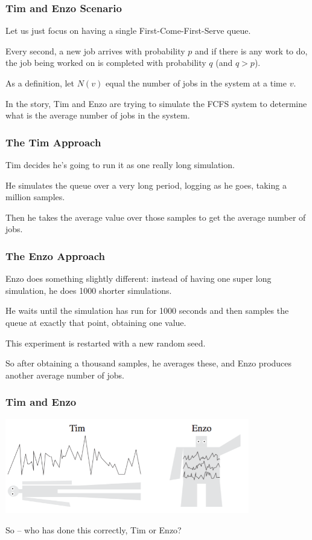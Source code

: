 \begin{frame}
\frametitle{Tim and Enzo Scenario}

Let us just focus on having a single First-Come-First-Serve queue. 

Every second, a new job arrives with probability $p$ and if there is any work to do, the job being worked on is completed with probability $q$ (and $q > p$). 

As a definition, let $N(v)$ equal the number of jobs in the system at a time $v$. 

In the story, Tim and Enzo are trying to simulate the FCFS system to determine what is the average number of jobs in the system.

\end{frame}



\begin{frame}
\frametitle{The Tim Approach}

Tim decides he's going to run it as one really long simulation. 

He simulates the queue over a very long period, logging as he goes, taking a million samples. 

Then he takes the average value over those samples to get the average number of jobs.

\end{frame}



\begin{frame}
\frametitle{The Enzo Approach}

Enzo does something slightly different: instead of having one super long simulation, he does 1000 shorter simulations. 

He waits until the simulation has run for 1000 seconds and then samples the queue at exactly that point, obtaining one value. 

This experiment is restarted with a new random seed. 

So after obtaining a thousand samples, he averages these, and Enzo produces another average number of jobs.


\end{frame}



\begin{frame}
\frametitle{Tim and Enzo}

\begin{center}
	\includegraphics[width=0.8\textwidth]{images/timenzo.png}
\end{center}

So -- who has done this correctly, Tim or Enzo?

\end{frame}



